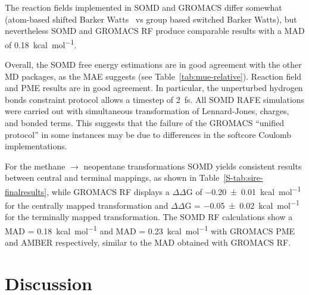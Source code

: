 \documentclass[journal=jctcce,manuscript=article]{achemso}
\begin{document}
The reaction fields implemented in SOMD and GROMACS differ somewhat (atom-based 
shifted Barker Watts~\cite{doi:10.1080/00268977300102101} vs group based 
switched Barker Watts), but nevertheless SOMD and GROMACS RF produce comparable results with a MAD of \SI{0.18}{kcal.mol^{-1}}.

Overall, the SOMD free energy estimations are in good agreement with the 
other MD packages, as the MAE suggests (see Table~\ref{tab:mue-relative}). 
Reaction field and PME 
results are in good agreement.  In particular, the unperturbed hydrogen bonds 
constraint protocol allows a timestep of \SI{2}{fs}. All SOMD RAFE simulations were carried out with simultaneous transformation of Lennard-Jones, charges, and bonded terms. This suggests that the failure of the GROMACS ``unified protocol'' in some 
instances may be due to differences in the softcore Coulomb implementations. 


For the methane $\rightarrow$ neopentane transformations SOMD yields consistent results between central and terminal mappings, as shown in 
Table~\ref{S-tab:sire-finalresults}, while GROMACS RF displays a $\Delta\Delta$G 
of \SI{-0.20 +-   0.01}{kcal.mol^{-1}} for the centrally mapped transformation 
and $\Delta\Delta$G = \SI{-0.05 +- 0.02}{kcal.mol^{-1}} for the terminally 
mapped transformation. The SOMD RF calculations show a MAD = 
\SI{0.18}{kcal.mol^{-1}} and MAD = \SI{0.23}{kcal.mol^{-1}} with GROMACS PME 
and AMBER respectively, similar to the MAD obtained with GROMACS RF.



\section{Discussion}
\label{sec:discuss}
\end{document}
